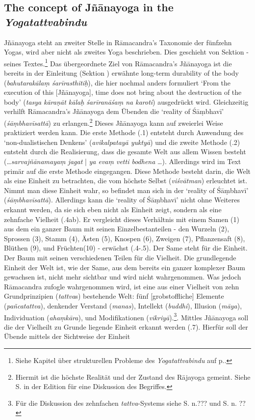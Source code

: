 \subsection{The concept of Jñānayoga in the \textit{Yogatattvabindu}}

Jñānayoga steht an zweiter Stelle in Rāmacandra's Taxonomie der fünfzehn Yogas, wird aber nicht als zweites Yoga beschrieben. Dies geschieht von Sektion - seines Textes.\footnote{Siehe Kapitel über strukturellen Probleme des \textit{Yogatattvabindu} auf p.\pageref{structuralissues}.} Das übergeordnete Ziel von Rāmacandra's Jñānayoga ist die bereits in der Einleitung (Sektion ) erwähnte long-term durability of the body (\textit{bahutarakālaṃ śarīrasthitiḥ}), die hier nochmal anders formuliert `From the execution of this [Jñānayoga], time does not bring about the destruction of the body' (\textit{tasya kāraṇāt kālaḥ śarīranāśaṃ na karoti}) ausgedrückt wird. Gleichzeitig verhilft Rāmacandra's Jñānayoga dem Übenden die `reality of Śāṃbhavī' (\textit{śāṃbhavīsattā}) zu erlangen.\footnote{Hiermit ist die höchste Realität und der Zustand des Rājayoga gemeint. Siehe S.\pageref{jnanayogatrans1} in der Edition für eine Diskussion des Begriffes.} Dieses Jñānayoga kann auf zweierlei Weise praktiziert werden kann. Die erste Methode (.1) entsteht durch Anwendung des `non-dualistischen Denkens' (\textit{avikalpatayā yuktyā}) und die zweite Methode (.2) entsteht durch die Realisierung, dass die gesamte Welt aus allem Wissen besteht (\ldots \textit{sarvajñānamayaṃ jagat} | \textit{ya evaṃ vetti bodhena} \ldots). Allerdings wird im Text primär auf die erste Methode eingegangen. Diese Methode besteht darin, die Welt als eine Einheit zu betrachten, die vom höchste Selbst (\textit{viśvātman}) erleuchtet ist. Nimmt man diese Einheit wahr, so befindet man sich in der `reality of Śāṃbhavī' (\textit{śāṃbhavīsattā}). Allerdings kann die `reality of Śāṃbhavī' nicht ohne Weiteres erkannt werden, da sie sich eben nicht als Einheit zeigt, sondern als eine zehnfache Vielheit (.4ab). Er vergleicht dieses Verhältnis mit einem Samen (1) aus dem ein ganzer Baum mit seinen Einzelbestanteilen - den Wurzeln (2), Sprossen (3), Stamm (4), Ästen (5), Knospen (6), Zweigen (7), Pflanzensaft (8), Blüthen (9), und Früchten(10) - erwächst (.4-.5). Der Same steht für die Einheit. Der Baum mit seinen verschiedenen Teilen für die Vielheit. Die grundlegende Einheit der Welt ist, wie der Same, aus dem bereits ein ganzer komplexer Baum gewachsen ist, nicht mehr sichtbar und wird nicht wahrgenommen. Was jedoch Rāmacandra zufogle wahrgenommen wird, ist eine aus einer Vielheit von zehn Grundprinzipien (\textit{tattva}s) bestehende Welt: fünf [grobstoffliche] Elemente (\textit{pañcatattva}), denkender Verstand (\textit{manas}), Intellekt (\textit{buddhi}), Illusion (\textit{māya}), Individuation (\textit{ahaṃkāra}), und Modifikationen (\textit{vikriyā}).\footnote{Für die Diskussion des zehnfachen \textit{tattva}-Systems siehe S.\pageref{??} n.??? und S.\pageref{??} n. ??}. Mittles Jñānayoga soll die der Vielheilt zu Grunde liegende Einheit erkannt werden (.7). Hierfür soll der Übende mittels der Sichtweise der Einheit 